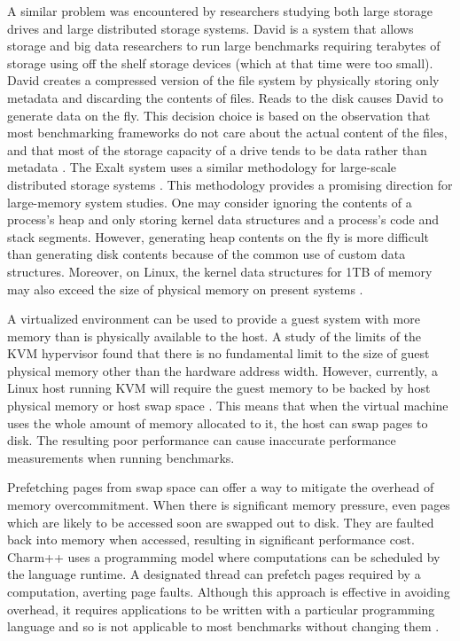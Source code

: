 \documentclass[twocolumn,11pt]{article}
\begin{document}
A similar problem was encountered by researchers studying both large storage
drives and large distributed storage systems. David is a system that allows
storage and big data researchers to run large benchmarks requiring terabytes of
storage using off the shelf storage devices (which at that time were too small).
David creates a compressed version of the file system by physically storing only
metadata and discarding the contents of files. Reads to the disk causes David to
generate data on the fly. This decision choice is based on the observation that
most benchmarking frameworks do not care about the actual content of the files,
and that most of the storage capacity of a drive tends to be data rather than
metadata \cite{david}. The Exalt system uses a similar methodology for
large-scale distributed storage systems \cite{exalt}. This methodology provides
a promising direction for large-memory system studies. One may consider ignoring
the contents of a process’s heap and only storing kernel data structures and a
process’s code and stack segments. However, generating heap contents on the fly
is more difficult than generating disk contents because of the common use of
custom data structures. Moreover, on Linux, the kernel data structures for 1TB
of memory may also exceed the size of physical memory on present systems
\cite{simics}.

A virtualized environment can be used to provide a guest system with more memory
than is physically available to the host. A study of the limits of the KVM
hypervisor found that there is no fundamental limit to the size of guest
physical memory other than the hardware address width. However, currently, a
Linux host running KVM will require the guest memory to be backed by host
physical memory or host swap space \cite{ibmkvm}.  This means that when the
virtual machine uses the whole amount of memory allocated to it, the host can
swap pages to disk. The resulting poor performance can cause inaccurate
performance measurements when running benchmarks.

Prefetching pages from swap space can offer a way to mitigate the overhead of
memory overcommitment. When there is significant memory pressure, even pages
which are likely to be accessed soon are swapped out to disk. They are faulted
back into memory when accessed, resulting in significant performance cost.
Charm++ uses a programming model where computations can be scheduled by the
language runtime. A designated thread can prefetch pages required by a
computation, averting page faults. Although this approach is effective in
avoiding overhead, it requires applications to be written with a particular
programming language and so is not applicable to most benchmarks without
changing them \cite{charmpp}.
\end{document}
